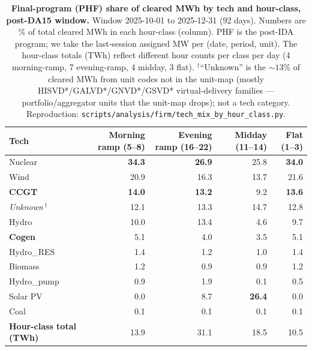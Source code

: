 \documentclass[11pt,a4paper]{article}
\begin{document}
\begin{table}[H]
\centering\footnotesize
\setlength{\tabcolsep}{6pt}
\begin{tabular}{l r r r r}
\toprule
\textbf{Tech} & \textbf{Morning ramp (5--8)} & \textbf{Evening ramp (16--22)} & \textbf{Midday (11--14)} & \textbf{Flat (1--3)} \\
\midrule
Nuclear      & \textbf{34.3} & \textbf{26.9} & 25.8 & \textbf{34.0} \\
Wind         & 20.9 & 16.3 & 13.7 & 21.6 \\
\textbf{CCGT}         & \textbf{14.0} & \textbf{13.2} & 9.2 & \textbf{13.6} \\
\emph{Unknown}\,$^{\dagger}$ & 12.1 & 13.3 & 14.7 & 12.8 \\
Hydro        & 10.0 & 13.4 & 4.6 & 9.7 \\
\textbf{Cogen}        & 5.1 & 4.0 & 3.5 & 5.1 \\
Hydro\_RES   & 1.4 & 1.2 & 1.0 & 1.4 \\
Biomass      & 1.2 & 0.9 & 0.9 & 1.2 \\
Hydro\_pump  & 0.9 & 1.9 & 0.1 & 0.5 \\
Solar PV     & 0.0 & 8.7 & \textbf{26.4} & 0.0 \\
Coal         & 0.1 & 0.1 & 0.1 & 0.1 \\
\midrule
\textbf{Hour-class total (TWh)} & 13.9 & 31.1 & 18.5 & 10.5 \\
\bottomrule
\end{tabular}
\caption{\textbf{Final-program (PHF) share of cleared MWh by tech and hour-class, post-DA15 window.} Window 2025-10-01 to 2025-12-31 (92 days). Numbers are \% of total cleared MWh in each hour-class (column). PHF is the post-IDA program; we take the last-session assigned MW per (date, period, unit). The hour-class totals (TWh) reflect different hour counts per class per day (4 morning-ramp, 7 evening-ramp, 4 midday, 3 flat).
$^{\dagger}$``Unknown'' is the $\sim\!13\%$ of cleared MWh from unit codes not in the unit-map (mostly HISVD*/GALVD*/GNVD*/GSVD* virtual-delivery families --- portfolio/aggregator units that the unit-map drops); not a tech category.
Reproduction: \texttt{scripts/analysis/firm/tech\_mix\_by\_hour\_class.py}.}
\label{tab:tech_mix_by_hourclass}
\end{table}
\end{document}
